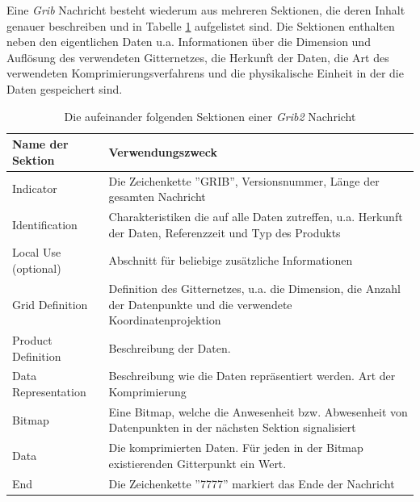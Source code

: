 Eine \textit{Grib} Nachricht besteht wiederum aus mehreren Sektionen,
die deren Inhalt genauer beschreiben und in Tabelle \ref{tab:grib}
aufgelistet sind. Die Sektionen enthalten neben den eigentlichen Daten
u.a. Informationen über die Dimension und Auflösung des verwendeten
Gitternetzes, die Herkunft der Daten, die Art des verwendeten
Komprimierungsverfahrens und die physikalische Einheit in der die
Daten gespeichert sind.

\begin{table}
  \centering
  {\sf
    \footnotesize
    \begin{longtable}{@{}lp{10cm}@{}}

      \toprule
      \textbf{Name der Sektion} & \textbf{Verwendungszweck} \\

      \midrule

      Indicator & Die Zeichenkette ''GRIB'', Versionsnummer, Länge der gesamten Nachricht \\

      Identification & Charakteristiken die auf alle Daten zutreffen, u.a. Herkunft der Daten, Referenzzeit und Typ des Produkts \\

      Local Use (optional) & Abschnitt für beliebige zusätzliche Informationen \\

      Grid Definition &  Definition des Gitternetzes, u.a. die Dimension, die Anzahl der Datenpunkte und die verwendete Koordinatenprojektion \\

      Product Definition &  Beschreibung der Daten. \\

      Data Representation &  Beschreibung wie die Daten repräsentiert werden. Art der Komprimierung \\

      Bitmap & Eine Bitmap, welche die Anwesenheit bzw. Abwesenheit von Datenpunkten in der nächsten Sektion signalisiert \\

      Data &  Die komprimierten Daten. Für jeden in der Bitmap existierenden Gitterpunkt ein Wert. \\

      End & Die Zeichenkette ''7777'' markiert das Ende der Nachricht \\

      \bottomrule

    \end{longtable}
  }

  \caption{Die aufeinander folgenden Sektionen einer \textit{Grib2} Nachricht}
  \label{tab:grib}

\end{table}

